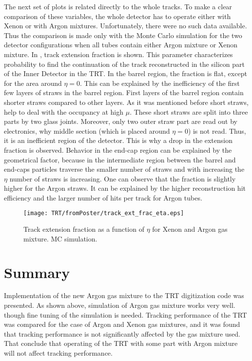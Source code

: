 The next set of plots is related directly to the whole tracks. To make a clear comparison of these variables, the whole detector has to operate either with Xenon or with Argon mixtures.
Unfortunately, there were no such data available. Thus the comparison is made only with the Monte Carlo simulation for the two detector configurations when all tubes contain either Argon mixture or Xenon mixture. In , track extension fraction is shown. This parameter characterizes
probability to find the continuation of the track reconstructed in the silicon part of the Inner Detector in the TRT.
In the barrel region, the fraction is flat, except for the area around $\eta = 0$. This can be explained by the inefficiency of the first few layers of straws in the barrel region.
First layers of the barrel region contain shorter straws compared to other layers. 
As it was mentioned before short straws, help to deal with the occupancy at high $\mu$.
These short straws are split into three parts by two glass joints. Moreover, only two outer straw part are read out by electronics, why middle section (which is placed around $\eta=0$) is not read. Thus, it is an inefficient region of the detector. 
This is why a drop in the extension fraction is observed.
Behavior in the end-cap region can be explained by the geometrical factor, because in the intermediate region between the barrel and end-caps particles
traverse the smaller number of straws and with increasing the $\eta$ number of straws is increasing.
One can observe that the fraction is slightly higher for the Argon straws. It can be explained by the higher reconstruction hit efficiency and the larger number of hits per
track for Argon tubes.

\begin{figure}
\begin{center}
 \texttt{[image: TRT/fromPoster/track\_ext\_frac\_eta.eps]}
\caption{Track extension fraction as a function of $\eta$ for Xenon and Argon gas mixture. MC simulation.}
\label{fig:track_ext_fraction}
\end{center}
\end{figure}

\section{Summary}
\label{sec:trt_summary}

Implementation of the new Argon gas mixture to the TRT digitization code was presented. As shown above, simulation of Argon gas mixture works very well. though 
fine tuning of the simulation is needed.
Tracking performance of the TRT was compared for the case of Argon and Xenon gas mixtures, and it was found that tracking performance is not significantly affected
by the gas mixture used. That conclude that operating of the TRT with some part with Argon mixture will not affect tracking performance.



